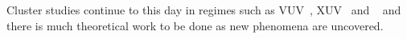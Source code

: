 Cluster studies continue to this day in regimes such as VUV~\cite{Arbeiter2011},
XUV~\cite{Murphy2008a,Murphy2008b,Krikunova2012} and \xrays~\cite{Ziaja2009b,Thomas2012,Timneanu2013}
and there is much theoretical work to be done as new phenomena are uncovered.


